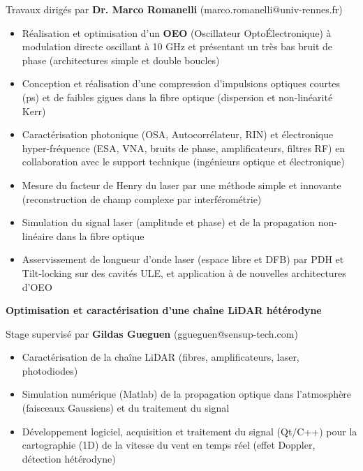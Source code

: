 \documentclass[9pt,a4paper,academicons]{altacv}
\begin{document}
Travaux dirigés par \textbf{Dr. Marco Romanelli} (marco.romanelli@univ-rennes.fr)
\smallskip
\small{
	\begin{itemize}
		\item Réalisation et optimisation d'un \textbf{OEO} (Oscillateur Opto\'Electronique) à modulation directe oscillant à 10 GHz et présentant un très bas bruit de phase (architectures simple et double boucles)
		\item Conception et réalisation d'une compression d'impulsions optiques courtes (ps) et de faibles gigues dans la fibre optique (dispersion et non-linéarité Kerr)
		\item Caractérisation photonique (OSA, Autocorrélateur, RIN) et électronique hyper-fréquence (ESA, VNA, bruits de phase, amplificateurs, filtres RF) en collaboration avec le support technique (ingénieurs optique et électronique)
		\item Mesure du facteur de Henry du laser par une méthode simple et innovante (reconstruction de champ complexe par interférométrie)
		\item Simulation  du signal laser (amplitude et phase) et de la propagation non-linéaire dans la fibre optique
		\item Asservissement de longueur d'onde laser (espace libre et DFB) par PDH et Tilt-locking sur des cavités ULE, et application à de nouvelles architectures d'OEO
	\end{itemize}
}

\divider


\textbf{Optimisation et caractérisation d'une chaîne LiDAR hétérodyne}\smallskip

Stage supervisé par \textbf{Gildas Gueguen} (ggueguen@sensup-tech.com)
\smallskip
\small{
	\begin{itemize}
		\item Caractérisation de la chaîne LiDAR (fibres, amplificateurs, laser, photodiodes)
		\item Simulation numérique (Matlab) de la propagation optique dans l'atmosphère (faisceaux Gaussiens) et du traitement du signal
		\item Développement logiciel, acquisition et traitement du signal (Qt/C++) pour la cartographie (1D) de la vitesse du vent en temps réel (effet Doppler, détection hétérodyne)
	\end{itemize}
}

\divider
\end{document}
